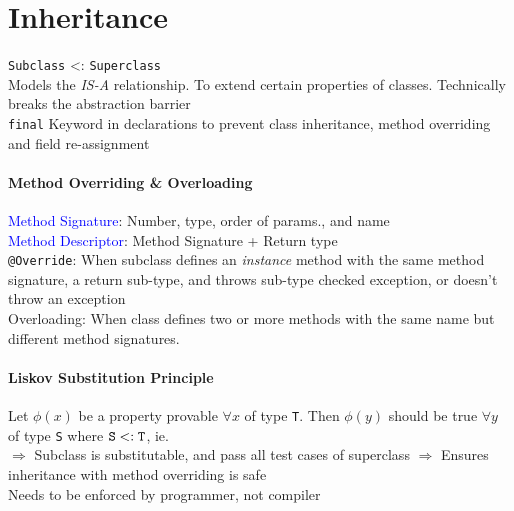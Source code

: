 \section{Inheritance}
\verb|Subclass| <: \verb|Superclass|\\
Models the \emph{IS-A} relationship. To extend certain properties of classes.
\textcolor{Bittersweet}{Technically breaks the abstraction barrier}\\
\verb|final| Keyword in declarations to prevent class inheritance, method
overriding and field re-assignment
\paragraph{Method Overriding \& Overloading}
\textcolor{Blue}{Method Signature}: Number, type, order of params., and name\\
\textcolor{Blue}{Method Descriptor}: Method Signature + Return type\\
\verb|@Override|: When subclass defines an \emph{instance} method with the same
method signature, a return sub-type, and throws sub-type checked exception, or
doesn't throw an exception\\
Overloading: When class defines two or more methods with the same name but
different method signatures.
\paragraph{Liskov Substitution Principle}
Let $\phi(x)$ be a property provable $\forall x$ of type \verb|T|. Then
$\phi(y)$ should be true $\forall y$ of type \verb|S| where
$\verb|S|<:\verb|T|$, ie.\\
$\Rightarrow$ Subclass is substitutable, and pass all test cases of superclass
$\Rightarrow$ Ensures inheritance with method overriding is safe\\
\textcolor{Bittersweet}{Needs to be enforced by programmer, not compiler}
